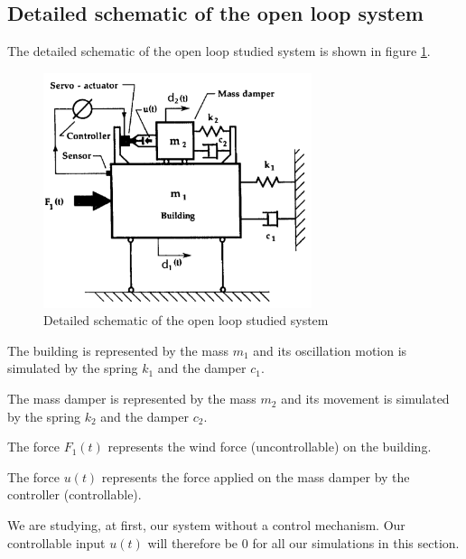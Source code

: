 \subsection{Detailed schematic of the open loop system}
The detailed schematic of the open loop studied system is shown in figure \ref{fig:detailed_schematic}.
\begin{figure}[H]
    \centering
    \includegraphics[width=0.7\textwidth]{resources/pdf/open-loop-diagram.pdf}
    \caption{Detailed schematic of the open loop studied system \cite{science_direct}}
    \label{fig:detailed_schematic}
\end{figure}
The building is represented by the mass $m_1$ and its oscillation motion is simulated by the spring $k_1$ and the damper $c_1$.\par
The mass damper is represented by the mass $m_2$ and its movement is simulated by the spring $k_2$ and the damper $c_2$.\par
The force $F_1(t)$ represents the wind force (uncontrollable) on the building.\par
The force $u(t)$ represents the force applied on the mass damper by the controller (controllable).\par
We are studying, at first, our system without a control mechanism. Our controllable input $u(t)$ will therefore be \num{0} for all our simulations in this section.
